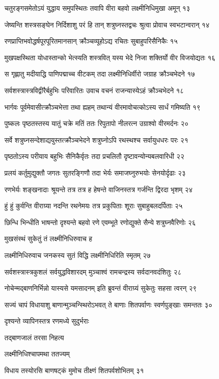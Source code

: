 चतुरङ्गसमेतोऽयं युद्धाय समुपस्थितः
तवापि वीरा बहवो लक्ष्मीनिधिमुखा अमून् १३

जेष्यन्ति शस्त्रसङ्घेन निर्दिशाशु परं हि तान्
शत्रुघ्नस्तद्वचः श्रुत्वा प्रोवाच स्वभटान्वरान् १४

रणप्राप्तिभवोद्धर्षपूरपूरितमानसान्
क्रौञ्चव्यूहोऽद्य रचितः सुबाहुपरिसैनिकैः १५

मुखपक्षस्थिता योधास्तान्को भेत्स्यति शस्त्रवित्
यस्य भेदे निजा शक्तिर्यो वीर विजयोद्यतः १६

स गृह्णातु मदीयाद्धि पाणिपद्माच्च वीटकम्
तदा लक्ष्मीनिधिर्वीरो जग्राह क्रौञ्चभेदने १७

सर्वशस्त्रास्त्रविद्वीरैर्बहुभिः परिवारितः
उवाच वचनं राजन्यास्येऽहं क्रौञ्चभेदने १८

भार्गवः पूर्वमेवासीत्क्रौञ्चभेत्ता तथा ह्यहम्
तथान्यं वीरमावोचत्कोऽस्य सार्धं गमिष्यति १९

पुष्कलः पृष्ठतस्तस्य यातुं चक्रे मतिं ततः
रिपुतापो नीलरत्न उग्राश्वो वीरमर्दनः २०

सर्वे शत्रुघ्नसन्देशाद्ययुस्तत्क्रौञ्चभेदने
शत्रुघ्नोऽपि रथस्थश्च सर्वायुधधरः परः २१

पृष्ठतोऽस्य परीयाय बहुभिः सैनिकैर्वृतः
तदा प्रचलितौ दृष्टावन्योन्यबलवारिधी २२

प्रलयं कर्तुमुद्युक्तौ जगतः सुतरङ्गिणौ
तदा भेर्यः समाजघ्नुरुभयोः सेनयोर्दृढाः २३

रणभेर्यः शङ्खनादाः श्रूयन्ते तत्र तत्र ह
हेषन्ते वाजिनस्तत्र गर्जन्ति द्विरदा भृशम् २४

हुं हुं कुर्वन्ति वीराग्र्या नदन्ति रथनेमयः
तत्र प्रकुपिताः शूराः सुबाहुबलदर्पिताः २५

छिन्धि भिन्धीति भाषन्तो दृश्यन्ते बहवो रणे
एवम्भूते रणोद्युक्ते सैन्ये शत्रुघ्नवैरिणोः २६

मुखसंस्थं सुकेतुं तं लक्ष्मीनिधिरुवाच ह

लक्ष्मीनिधिरुवाच
जनकस्य सुतं विद्धि लक्ष्मीनिधिरिति स्मृतम् २७

सर्वशस्त्रास्त्रकुशलं सर्वयुद्धविशारदम्
मुञ्चाश्वं रामचन्द्रस्य सर्वदानवदंशितुः २८

नोचेन्मद्बाणनिर्भिन्नो यास्यसे यमसादनम्
इति ब्रुवन्तं वीराग्र्यं सुकेतुः सहसा त्वरन् २९

सज्यं चापं विधायाशु बाणान्मुञ्चन्स्थिरोऽभवत्
ते बाणाः शितपर्वाणः स्वर्णपुङ्खाः समन्ततः ३०

दृश्यन्ते व्यापिनस्तत्र रणमध्ये सुदुर्भराः

तद्बाणजालं तरसा निहत्य

लक्ष्मीनिधिश्चापमथा ततज्यम्

विधाय तस्योरसि बाणषट्कं
मुमोच तीक्ष्णं शितपर्वशोभितम् ३१

